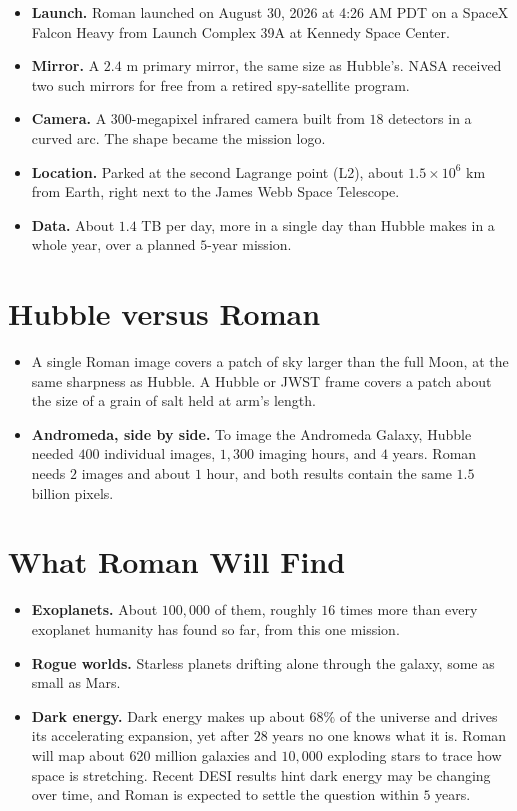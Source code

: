 \documentclass[11pt]{article}
\begin{document}
\begin{itemize}
\item \textbf{Launch.} Roman launched on August 30, 2026 at 4:26 AM PDT on a SpaceX
Falcon Heavy from Launch Complex 39A at Kennedy Space Center.
\item \textbf{Mirror.} A $2.4$ m primary mirror, the same size as Hubble's. NASA
received two such mirrors for free from a retired spy-satellite program.
\item \textbf{Camera.} A $300$-megapixel infrared camera built from $18$ detectors
in a curved arc. The shape became the mission logo.
\item \textbf{Location.} Parked at the second Lagrange point (L2), about
$1.5 \times 10^{6}$ km from Earth, right next to the James Webb Space Telescope.
\item \textbf{Data.} About $1.4$ TB per day, more in a single day than Hubble makes
in a whole year, over a planned $5$-year mission.
\end{itemize}

\section{Hubble versus Roman}

\begin{itemize}
\item A single Roman image covers a patch of sky larger than the full Moon, at the
same sharpness as Hubble. A Hubble or JWST frame covers a patch about the size of a
grain of salt held at arm's length.
\item \textbf{Andromeda, side by side.} To image the Andromeda Galaxy, Hubble needed
$400$ individual images, $1{,}300$ imaging hours, and $4$ years. Roman needs $2$
images and about $1$ hour, and both results contain the same $1.5$ billion pixels.
\end{itemize}

\section{What Roman Will Find}

\begin{itemize}
\item \textbf{Exoplanets.} About $100{,}000$ of them, roughly $16$ times more than
every exoplanet humanity has found so far, from this one mission.
\item \textbf{Rogue worlds.} Starless planets drifting alone through the galaxy, some
as small as Mars.
\item \textbf{Dark energy.} Dark energy makes up about $68\%$ of the universe and
drives its accelerating expansion, yet after $28$ years no one knows what it is.
Roman will map about $620$ million galaxies and $10{,}000$ exploding stars to trace
how space is stretching. Recent DESI results hint dark energy may be changing over
time, and Roman is expected to settle the question within $5$ years.
\end{itemize}
\end{document}

